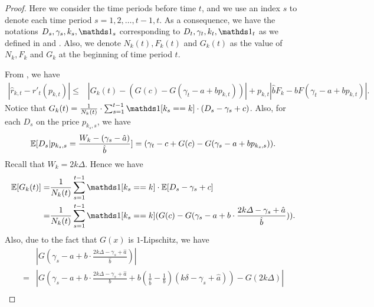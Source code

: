 \begin{proof}
    Here we consider the time periods before time $t$, and we use an index $s$ to denote each time period $s=1,2,\ldots, t-1, t$. As a consequence, we have the notations $D_s, \gamma_s, k_s, \ind_s$ corresponding to $D_t, \gamma_t, k_t, \ind_t$ as we defined in  and . Also, we denote $N_k(t), F_k(t)$ and $G_k(t)$ as the value of $N_k, F_k$ and $G_k$ at the beginning of time period $t$.

    From , we have
    \begin{equation}
        \label{eq:r'_estimate_decomposition_1}
        \begin{aligned}
            |\hat r_{k,t} - r'_t(p_{k,t})|\leq&|G_k(t)-(G(c)-G(\gamma_t-a+bp_{k,t}))|+p_{k,t}|\hat bF_k-bF(\gamma_t-a+bp_{k,t})|.
        \end{aligned}
    \end{equation}
    Notice that $G_k(t)=\frac1{N_k(t)}\cdot\sum_{s=1}^{t-1}\ind[k_s==k]\cdot(D_s-\gamma_s+c)$. Also, for each $D_s$ on the price $p_{k_s, s}$, we have
    \begin{equation}
        \label{eq:expectation_d_s}
        \begin{aligned}
            \mathbb{E}[D_s|p_{k_s, s}=\frac{W_k-(\gamma_s-\hat a)}{\hat b}]=(\gamma_t-c+G(c)-G(\gamma_s-a+bp_{k_s,s})).
        \end{aligned}
    \end{equation}
    Recall that $W_k=2k\Delta$. Hence we have
    \begin{equation}
        \label{eq:expectation_g_k_t}
        \begin{aligned}
            \E[G_k(t)]=&\frac1{N_k(t)}\sum_{s=1}^{t-1}\ind[k_s==k]\cdot\E[D_s-\gamma_s+c]\\
            =&\frac1{N_k(t)}\sum_{s=1}^{t-1}\ind[k_s==k](G(c)-G(\gamma_s-a+b\cdot\frac{2k\Delta-\gamma_s+\hat a}{\hat b})).
        \end{aligned}
    \end{equation}
    Also, due to the fact that $G(x)$ is $1$-Lipschitz, we have
    \begin{equation}
        \label{eq:g_k_estimation_error}
        \begin{aligned}
            &|G(\gamma_s-a+b\cdot\frac{2k\Delta-\gamma_s+\hat a}{\hat b})|\\
            =&|G(\gamma_s-a+b\cdot\frac{2k\Delta-\gamma_s+\hat a}{b} +b(\frac1{\hat b}-\frac1b)(k\delta-\gamma_s+\hat a)) - G(2k\Delta)|\\

\end{aligned}
\end{equation}
\end{proof}
